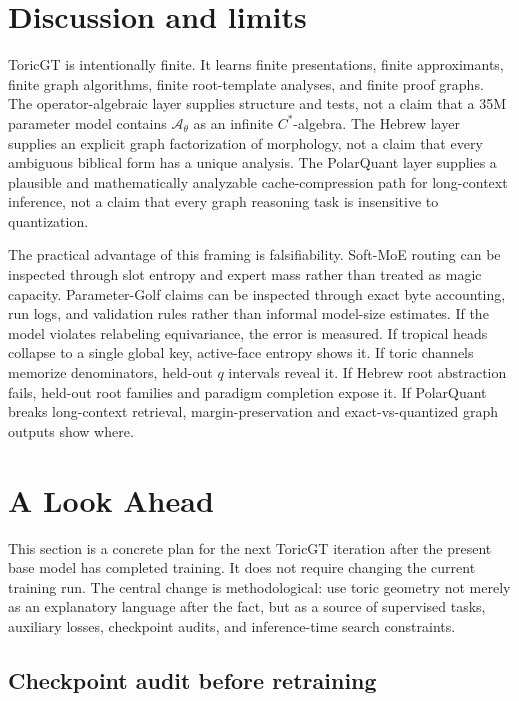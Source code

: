 \documentclass[11pt]{article}
\theoremstyle{definition}
\theoremstyle{plain}
\theoremstyle{remark}
\numberwithin{equation}{section}
\newcommand{\A}{\mathcal{A}}
\begin{document}
\section{Discussion and limits}

ToricGT is intentionally finite.  It learns finite presentations, finite approximants, finite graph algorithms, finite root-template analyses, and finite proof graphs.  The operator-algebraic layer supplies structure and tests, not a claim that a 35M parameter model contains $\A_\theta$ as an infinite $C^*$-algebra.  The Hebrew layer supplies an explicit graph factorization of morphology, not a claim that every ambiguous biblical form has a unique analysis.  The PolarQuant layer supplies a plausible and mathematically analyzable cache-compression path for long-context inference, not a claim that every graph reasoning task is insensitive to quantization.

The practical advantage of this framing is falsifiability.  Soft-MoE routing can be inspected through slot entropy and expert mass rather than treated as magic capacity.  Parameter-Golf claims can be inspected through exact byte accounting, run logs, and validation rules rather than informal model-size estimates.  If the model violates relabeling equivariance, the error is measured.  If tropical heads collapse to a single global key, active-face entropy shows it.  If toric channels memorize denominators, held-out $q$ intervals reveal it.  If Hebrew root abstraction fails, held-out root families and paradigm completion expose it.  If PolarQuant breaks long-context retrieval, margin-preservation and exact-vs-quantized graph outputs show where.

\section{A Look Ahead}

This section is a concrete plan for the next ToricGT iteration after the present base model has completed training.  It does not require changing the current training run.  The central change is methodological: use toric geometry not merely as an explanatory language after the fact, but as a source of supervised tasks, auxiliary losses, checkpoint audits, and inference-time search constraints.

\subsection{Checkpoint audit before retraining}
\end{document}
